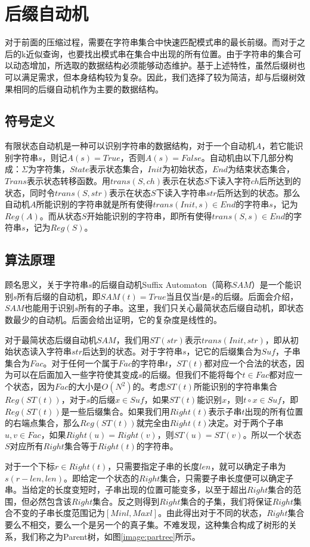 ﻿\documentclass{sysuthesis}
\begin{document}
\chapter{后缀自动机}
对于前面的压缩过程，需要在字符串集合中快速匹配模式串的最长前缀。而对于之后的k近似查询，也要找出模式串在集合中出现的所有位置。由于字符串的集合可以动态增加，所选取的数据结构必须能够动态维护。基于上述特性，虽然后缀树也可以满足需求，但本身结构较为复杂。因此，我们选择了较为简洁，却与后缀树\cite{ukkonen1995line}效果相同的后缀自动机\cite{ukkonen1993approximate}作为主要的数据结构。



\section{符号定义}
有限状态自动机是一种可以识别字符串的数据结构，对于一个自动机$A$，若它能识别字符串$s$，则记$A(s) = True$，否则$A(s) = False$。自动机由以下几部分构成：$\Sigma$为字符集，$State$表示状态集合，$Init$为初始状态，$End$为结束状态集合，$Trans$表示状态转移函数。用$trans(S, ch)$表示在状态$S$下读入字符$ch$后所达到的状态，同时令$trans(S, str)$表示在状态$S$下读入字符串$str$后所达到的状态。那么自动机$A$所能识别的字符串就是所有使得$trans(Init, s) \in End$的字符串$s$，记为$Reg(A)$。而从状态$S$开始能识别的字符串，即所有使得$trans(S, s) \in End$的字符串$s$，记为$Reg(S)$。



\section{算法原理}
顾名思义，关于字符串$s$的后缀自动机Suffix Automaton（简称$SAM$）是一个能识别$s$所有后缀的自动机，即$SAM(t) = True$当且仅当$t$是$s$的后缀。后面会介绍，$SAM$也能用于识别$s$所有的子串。这里，我们只关心最简状态后缀自动机，即状态数最少的自动机。后面会给出证明，它的复杂度是线性的。\par
对于最简状态后缀自动机$SAM$，我们用$ST(str)$表示$trans(Init, str)$，即从初始状态读入字符串$str$后达到的状态。对于字符串$s$，记它的后缀集合为$Suf$，子串集合为$Fac$。对于任何一个属于$Fac$的字符串$t$，$ST(t)$都对应一个合法的状态，因为可以在后面加入一些字符使其变成$s$的后缀。但我们不能将每个$t \in Fac$都对应一个状态，因为$Fac$的大小是$O(N^2)$的。考虑$ST(t)$所能识别的字符串集合$Reg(ST(t))$，对于$s$的后缀$x \in Suf$，如果$ST(t)$能识别$x$，则$t \circ x \in Suf$，即$Reg(ST(t))$是一些后缀集合。如果我们用$Right(t)$表示子串$t$出现的所有位置的右端点集合，那么$Reg(ST(t))$就完全由$Right(t)$决定。对于两个子串$u, v \in Fac$，如果$Right(u) = Right(v)$，则$ST(u) = ST(v)$。所以一个状态$S$对应所有$Right$集合等于$Right(t)$的字符串。\par
对于一个下标$r \in Right(t)$，只需要指定子串的长度$len$，就可以确定子串为$s(r - len, len)$。即给定一个状态的$Right$集合，只需要子串长度便可以确定子串。当给定的长度变短时，子串出现的位置可能变多，以至于超出$Right$集合的范围，但必然包含该$Right$集合。反之则得到$Right$集合的子集，我们将保证$Right$集合不变的子串长度范围记为$[Minl, Maxl]$。由此得出对于不同的状态，$Right$集合要么不相交，要么一个是另一个的真子集。不难发现，这种集合构成了树形的关系，我们称之为Parent树，如图\ref{image:partree}所示。\par
\end{document}
